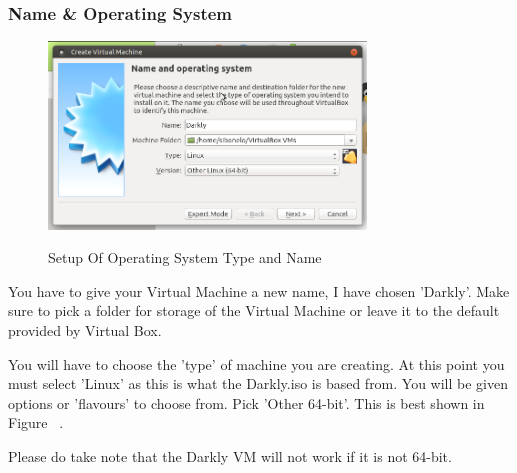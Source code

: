 \subsubsection{Name \& Operating System}
\begin{figure}[!htb]
    \centering
    \includegraphics[width=0.752\textwidth]{images/00-01.png}\\[0cm]  
    \caption[Virtual Box]{Setup Of Operating System Type and Name}
    \label{fig:00-02 - Windows Virtual Box Operating System} 
\end{figure}
You have to give your Virtual Machine a new name, I have chosen 'Darkly'. Make
sure to pick a folder for storage of the Virtual Machine or leave it to the
default provided by Virtual Box.

You will have to choose the 'type' of machine you are creating. At this point
you must select 'Linux' as this is what the Darkly.iso is based from. You will
be given options or 'flavours' to choose from. Pick 'Other 64-bit'. This is
best shown in Figure ~.

Please do take note that the Darkly VM will not work if it is not 64-bit.

